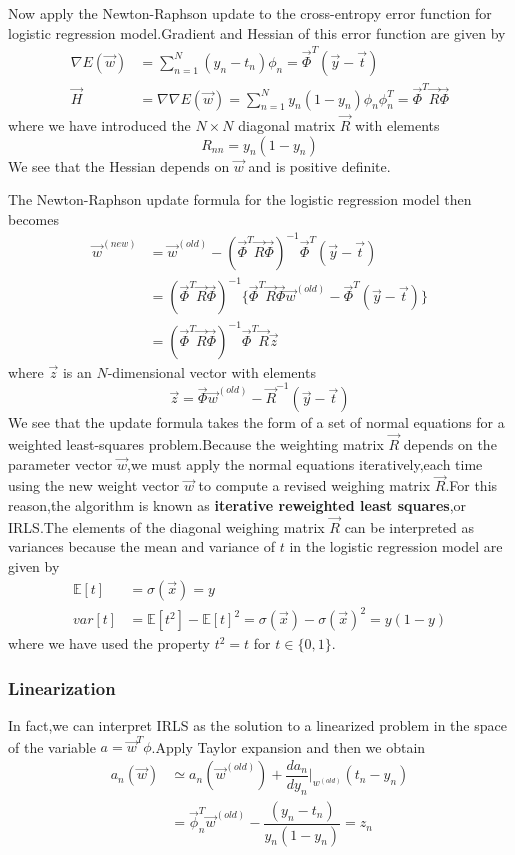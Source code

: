Now apply the Newton-Raphson update to the cross-entropy  error function for logistic regression model.Gradient and Hessian of this error function are given by
\begin{align}
\nabla E(\vec{w})&=\sum_{n=1}^{N}(y_n-t_n)\phi_n
=\vec{\Phi}^T(\vec{y}-\vec{t}) \\
\vec{H} &= \nabla\nabla E(\vec{w})= \sum_{n=1}^{N}y_n(1-y_n)\phi_n\phi_n^T=\vec{\Phi}^T\vec{R}\vec{\Phi}
\end{align}
where we have introduced the $N\times N$ diagonal matrix $\vec{R}$ with elements
\begin{equation}
R_{nn}=y_n(1-y_n)
\end{equation}
We see that the Hessian depends on $\vec{w}$ and is positive definite.

The Newton-Raphson update formula for the logistic regression model then becomes
\begin{align}
\vec{w}^{(new)} &= \vec{w}^{(old)} -(\vec{\Phi}^T\vec{R}\vec{\Phi})^{-1}\vec{\Phi}^T(\vec{y}-\vec{t}) \\
&=(\vec{\Phi}^T\vec{R}\vec{\Phi})^{-1}\{\vec{\Phi}^T\vec{R}\vec{\Phi}\vec{w}^{(old)} -\vec{\Phi}^T(\vec{y}-\vec{t}) \} \\
&=(\vec{\Phi}^T\vec{R}\vec{\Phi})^{-1}\vec{\Phi}^T\vec{R}\vec{z}
\end{align}
where $\vec{z}$ is an $N$-dimensional vector with elements
\begin{equation}
\vec{z} = \vec{\Phi}\vec{w}^{(old)}-\vec{R}^{-1}(\vec{y}-\vec{t})
\end{equation}
We see that the update formula takes the form of a set of normal equations for a weighted least-squares problem.Because the weighting matrix $\vec{R}$ depends on the parameter vector $\vec{w}$,we must apply the normal equations iteratively,each time using the new weight vector $\vec{w}$ to compute a revised weighing matrix $\vec{R}$.For this reason,the algorithm is known as \textbf{iterative reweighted least squares},or IRLS.The elements of the diagonal weighing matrix $\vec{R}$ can be interpreted as variances because the mean and variance of $t$ in the logistic regression model are given by
\begin{align}
\mathbb{E}[t] &=\sigma(\vec{x}) = y\\
var[t]&=\mathbb{E}[t^2] -\mathbb{E}[t]^2 = \sigma(\vec{x})-\sigma(\vec{x})^2 = y(1-y)
\end{align}
where we have used the property $t^2=t$ for $t\in \{0,1\}$.

\subsubsection{Linearization}
In fact,we can interpret IRLS as the solution to a linearized problem in the space of the variable $a=\vec{w}^T\phi$.Apply Taylor expansion and then we obtain
\begin{align}
a_n(\vec{w}) &\simeq a_n(\vec{w}^{(old)})+\dfrac{da_n}{dy_n}\bigg|_{w^{(old)}}(t_n-y_n) \\
&=\vec{\phi}_n^T\vec{w}^{(old)}-\dfrac{(y_n-t_n)}{y_n(1-y_n)} =z_n
\end{align}

